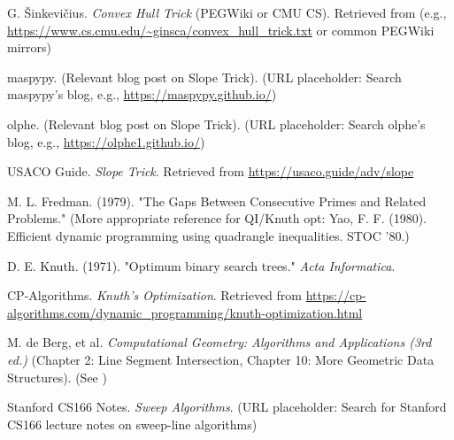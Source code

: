 \begin{thebibliography}{99}
G. Šinkevičius. \textit{Convex Hull Trick} (PEGWiki or CMU CS).
Retrieved from (e.g., \url{https://www.cs.cmu.edu/~ginsca/convex_hull_trick.txt} or common PEGWiki mirrors)
\label{ref:pegwiki_cht}

maspypy. (Relevant blog post on Slope Trick).
(URL placeholder: Search maspypy's blog, e.g., \url{https://maspypy.github.io/})
\label{ref:maspypy_slope_trick_blog}

olphe. (Relevant blog post on Slope Trick).
(URL placeholder: Search olphe's blog, e.g., \url{https://olphe1.github.io/})
\label{ref:olphe_slope_trick_blog}

USACO Guide. \textit{Slope Trick}.
Retrieved from \url{https://usaco.guide/adv/slope}
\label{ref:usaco_guide_slope_trick}

M. L. Fredman. (1979). "The Gaps Between Consecutive Primes and Related Problems." %
(More appropriate reference for QI/Knuth opt: Yao, F. F. (1980). Efficient dynamic programming using quadrangle inequalities. STOC '80.)
\label{ref:fredman1979_or_yao1980} %

D. E. Knuth. (1971). "Optimum binary search trees." \textit{Acta Informatica}.
\label{ref:knuth1971_obst}

CP-Algorithms. \textit{Knuth's Optimization}.
Retrieved from \url{https://cp-algorithms.com/dynamic_programming/knuth-optimization.html}
\label{ref:cpalgorithms_knuth_opt}

M. de Berg, et al. \textit{Computational Geometry: Algorithms and Applications (3rd ed.)} (Chapter 2: Line Segment Intersection, Chapter 10: More Geometric Data Structures).
(See )
\label{ref:deberg_ch2_ch10}

Stanford CS166 Notes. \textit{Sweep Algorithms}.
(URL placeholder: Search for Stanford CS166 lecture notes on sweep-line algorithms)
\label{ref:stanford_cs166_sweep}


\end{thebibliography}
